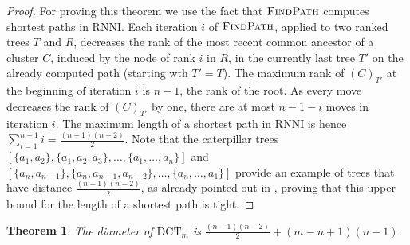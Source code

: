 \documentclass[11pt]{amsart}
\newtheorem{theorem}{Theorem}
\newcommand{\rnni}{\mathrm{RNNI}}
\newcommand{\findpath}{\textsc{FindPath}}
\newcommand{\dtt}{\mathrm{DCT}}
\newcommand{\dct}{\mathrm{DCT}} %
\providecommand{\DIFaddtex}[1]{{\protect\color{blue}\uwave{#1}}} %
\providecommand{\DIFdeltex}[1]{{\protect\color{red}\sout{#1}}}                      %
\providecommand{\DIFaddbegin}{} %
\providecommand{\DIFaddend}{} %
\providecommand{\DIFdelbegin}{} %
\providecommand{\DIFdelend}{} %
\providecommand{\DIFadd}[1]{\texorpdfstring{\DIFaddtex{#1}}{#1}} %
\providecommand{\DIFdel}[1]{\texorpdfstring{\DIFdeltex{#1}}{}} %
\newcommand{\DIFscaledelfig}{0.5}
\newlength{\DIFdelgraphicswidth} %
\newlength{\DIFdelgraphicsheight} %
\newcommand{\DIFaddincludegraphics}[2][]{{\color{blue}\fbox{\DIFOincludegraphics[#1]{#2}}}} %
\newcommand{\DIFdelincludegraphics}[2][]{%
\sbox{\DIFdelgraphicsbox}{\DIFOincludegraphics[#1]{#2}}%
\settoboxwidth{\DIFdelgraphicswidth}{\DIFdelgraphicsbox} %
\settoboxtotalheight{\DIFdelgraphicsheight}{\DIFdelgraphicsbox} %
\scalebox{\DIFscaledelfig}{%
\parbox[b]{\DIFdelgraphicswidth}{\usebox{\DIFdelgraphicsbox}\\[-\baselineskip] \rule{\DIFdelgraphicswidth}{0em}}\llap{\resizebox{\DIFdelgraphicswidth}{\DIFdelgraphicsheight}{%
\setlength{\unitlength}{\DIFdelgraphicswidth}%
\begin{picture}(1,1)%
\thicklines\linethickness{2pt} %
{\color[rgb]{1,0,0}\put(0,0){\framebox(1,1){}}}%
{\color[rgb]{1,0,0}\put(0,0){\line( 1,1){1}}}%
{\color[rgb]{1,0,0}\put(0,1){\line(1,-1){1}}}%
\end{picture}%
}\hspace*{3pt}}} %
} %
\DeclareRobustCommand{\DIFaddbegin}{\DIFOaddbegin \let\includegraphics\DIFaddincludegraphics} %
\DeclareRobustCommand{\DIFaddend}{\DIFOaddend \let\includegraphics\DIFOincludegraphics} %
\DeclareRobustCommand{\DIFdelbegin}{\DIFOdelbegin \let\includegraphics\DIFdelincludegraphics} %
\DeclareRobustCommand{\DIFdelend}{\DIFOaddend \let\includegraphics\DIFOincludegraphics} %
\begin{document}
\begin{proof}
	For proving this theorem we use the fact that $\findpath$ computes shortest paths in $\rnni$.
	Each iteration $i$ of $\findpath$, applied to two ranked trees $T$ and $R$, decreases the rank of the most recent common ancestor of a cluster $C$, induced by the node of rank $i$ in $R$, in the currently last tree $T'$ on the already computed path (starting wth $T' = T$).
	The maximum rank of $(C)_{T'}$ at the beginning of iteration $i$ is $n-1$, the rank of the root.
	As every move decreases the rank of $(C)_{T'}$ by one, there are at most $n-1-i$ moves in iteration $i$.
	The maximum length of a shortest path in $\rnni$ is hence $\sum \limits_{i = 1}^{n-1} i = \frac{(n-1)(n-2)}{2}$.
	Note that the caterpillar trees $[\{a_1, a_2\}, \{a_1, a_2, a_3\}, \ldots, \{a_1, \ldots, a_n\}]$ and $[\{a_n, a_{n-1}\}, \{a_n, a_{n-1}, a_{n-2}\}, \ldots, \{a_n, \ldots, a_1\}]$ provide an example of trees that have distance $\frac{(n-1)(n-2)}{2}$, as already pointed out in \DIFdelbegin %
\DIFdelend \DIFaddbegin \autocite[Corollary 1]{Collienne2021}\DIFaddend , proving that this upper bound for the length of a shortest path is tight.
\end{proof}

\begin{theorem}
	The diameter of \DIFdelbegin \DIFdel{$\dtt_m$ }\DIFdelend \DIFaddbegin \DIFadd{$\dct_m$ }\DIFaddend is $\frac{(n-1)(n-2)}{2} + (m-n+1)(n-1)$.
	\label{thm:dtt_diameter}
\end{theorem}
\end{document}
